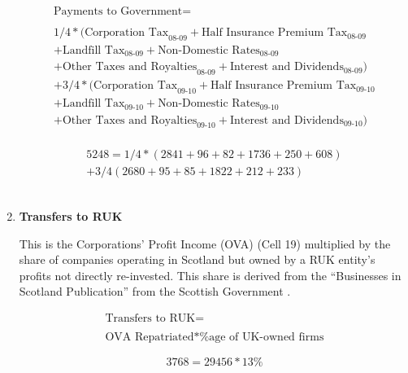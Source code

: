 \begin{enumerate}
\begin{equation}
\begin{split}
\text{Payments to Government} =  \\ \\
1/4*(\text{Corporation Tax}_\text{08-09}+\text{Half Insurance Premium Tax}_\text{08-09}\\
+\text{Landfill Tax}_\text{08-09}+\text{Non-Domestic Rates}_\text{08-09}\\
+\text{Other Taxes and Royalties}_\text{08-09}+\text{Interest and Dividends}_\text{08-09})\\
+3/4*(\text{Corporation Tax}_\text{09-10}+\text{Half Insurance Premium Tax}_\text{09-10}\\
+\text{Landfill Tax}_\text{09-10}+\text{Non-Domestic Rates}_\text{09-10}\\
+\text{Other Taxes and Royalties}_\text{09-10}+\text{Interest and Dividends}_\text{09-10})\\
\end{split} \label{eq:2.5.30}
\end{equation}

\begin{equation} \nonumber
\begin{split}
5248 = 1/4*(2841+96+82+1736+250+608)\\
+3/4(2680+95+85+1822+212+233)
\end{split}
\end{equation}\\


\item \textbf {Transfers to RUK}

This is the Corporations' Profit Income (OVA) (Cell 19) multiplied by the share of companies operating in Scotland but owned by a RUK entity's profits not directly re-invested. This share is derived from the ``Businesses in Scotland Publication'' from the Scottish Government \cite{ONS2011c, ScotGov2011}.

\begin{equation}
\begin{split}
\text{Transfers to RUK} =  \\ \\
\text{OVA Repatriated}*\text{\%age of UK-owned firms}
\end{split} \label{eq:2.5.31}
\end{equation}

\begin{equation} \nonumber
3768 = 29456*13\%
\end{equation}\\


\end{enumerate}
